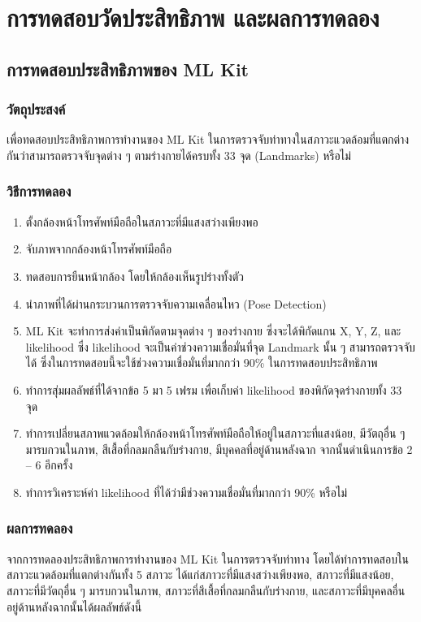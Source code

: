 \chapter{การทดสอบวัดประสิทธิภาพ และผลการทดลอง}

\section{การทดสอบประสิทธิภาพของ ML Kit}

\subsection{วัตถุประสงค์}
เพื่อทดสอบประสิทธิภาพการทำงานของ ML Kit ในการตรวจจับท่าทางในสภาวะแวดล้อมที่แตกต่างกันว่าสามารถตรวจจับจุดต่าง ๆ ตามร่างกายได้ครบทั้ง 33 จุด (Landmarks) หรือไม่

\subsection{วิธีการทดลอง}
\begin{enumerate}
	\item ตั้งกล้องหน้าโทรศัพท์มือถือในสภาวะที่มีแสงสว่างเพียงพอ
	\item จับภาพจากกล้องหน้าโทรศัพท์มือถือ
	\item ทดสอบการยืนหน้ากล้อง โดยให้กล้องเห็นรูปร่างทั้งตัว
	\item นำภาพที่ได้ผ่านกระบวนการตรวจจับความเคลื่อนไหว (Pose Detection)
	\item ML Kit จะทำการส่งค่าเป็นพิกัดตามจุดต่าง ๆ ของร่างกาย ซึ่งจะได้พิกัดแกน X, Y, Z, และ likelihood ซึ่ง likelihood จะเป็นค่าช่วงความเชื่อมั่นที่จุด Landmark นั้น ๆ สามารถตรวจจับได้ ซึ่งในการทดสอบนี้จะใช้ช่วงความเชื่อมั่นที่มากกว่า 90\% ในการทดสอบประสิทธิภาพ
	\item ทำการสุ่มผลลัพธ์ที่ได้จากข้อ 5 มา 5 เฟรม เพื่อเก็บค่า likelihood ของพิกัดจุดร่างกายทั้ง 33 จุด
	\item ทำการเปลี่ยนสภาพแวดล้อมให้กล้องหน้าโทรศัพท์มือถือให้อยู่ในสภาวะที่แสงน้อย, มีวัตถุอื่น ๆ มารบกวนในภาพ, สีเสื้อที่กลมกลืนกับร่างกาย, มีบุคคลที่อยู่ด้านหลังฉาก จากนั้นดำเนินการข้อ 2 – 6 อีกครั้ง
	\item ทำการวิเคราะห์ค่า likelihood ที่ได้ว่ามีช่วงความเชื่อมั่นที่มากกว่า 90\% หรือไม่
\end{enumerate}

\subsection{ผลการทดลอง}
จากการทดลองประสิทธิภาพการทำงานของ ML Kit ในการตรวจจับท่าทาง โดยได้ทำการทดสอบในสภาวะแวดล้อมที่แตกต่างกันทั้ง 5 สภาวะ ได้แก่สภาวะที่มีแสงสว่างเพียงพอ, สภาวะที่มีแสงน้อย, สภาวะที่มีวัตถุอื่น ๆ มารบกวนในภาพ, สภาวะที่สีเสื้อที่กลมกลืนกับร่างกาย, และสภาวะที่มีบุคคลอื่นอยู่ด้านหลังฉากนั้นได้ผลลัพธ์ดังนี้
